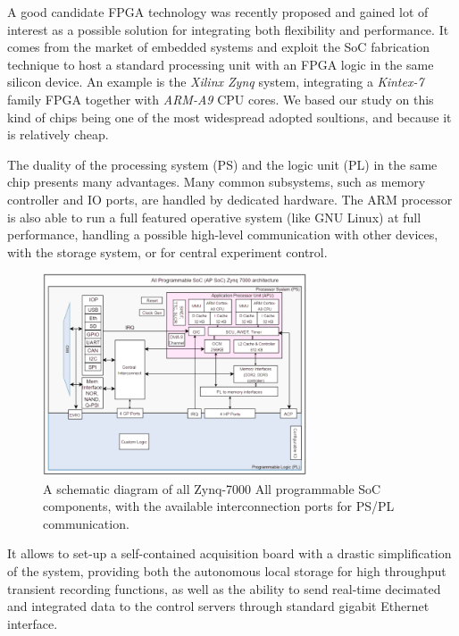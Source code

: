 A good candidate FPGA technology was recently proposed and gained lot of interest as a possible solution for integrating both flexibility and performance. It comes from the market of embedded systems and exploit the \ac{SoC} fabrication technique to host a standard processing unit with an FPGA logic in the same silicon device.
An example is the \textit{Xilinx Zynq} system, integrating a \textit{Kintex-7} family FPGA together with \textit{ARM-A9} CPU cores. 
We based our study on this kind of chips being one of the most widespread adopted soultions, and because it is relatively cheap.

The duality of the processing system (PS) and the logic unit (PL) in the same chip presents many advantages. Many common subsystems, such as memory controller and IO ports, are handled by dedicated hardware. The ARM processor is also able to run a full featured operative system (like GNU Linux) at full performance, handling a possible high-level communication with other devices, with the storage system, or for central experiment control. 

\begin{figure}
    \centering
    \includegraphics[height=6cm]{img/4_EmbeddedML/zynq_schema.png}
    \caption{A schematic diagram of all Zynq-7000 All programmable SoC components, with the available interconnection ports for PS/PL communication.}
    \label{fig:zinq-7000}
\end{figure}

It allows to set-up a self-contained acquisition board with a drastic simplification of the system, providing both the autonomous local storage for high throughput transient recording functions, as well as the ability to send real-time decimated and integrated data to the control servers through standard gigabit Ethernet interface. 

